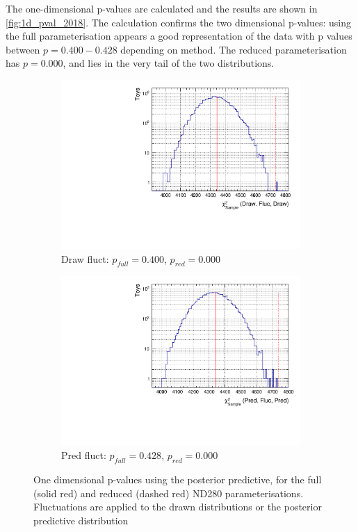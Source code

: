 The one-dimensional p-values are calculated and the results are shown in \autoref{fig:1d_pval_2018}. The calculation confirms the two dimensional p-values: using the full parameterisation appears a good representation of the data with p values between $p=0.400-0.428$ depending on method. The reduced parameterisation has $p=0.000$, and lies in the very tail of the two distributions.
\begin{figure}[h]
	\centering
	\begin{subfigure}[t]{0.49\textwidth}
		\includegraphics[width=\textwidth, trim={0mm 0mm 0mm 0mm}, clip,page=1]{figures/mach3/2018/data/fullcov_pval_drawflucdraw}
		\caption{Draw fluct: $p_{full}=0.400$, $p_{red}=0.000$}
	\end{subfigure}
	\begin{subfigure}[t]{0.49\textwidth}
		\includegraphics[width=\textwidth, trim={0mm 0mm 0mm 0mm}, clip,page=1]{figures/mach3/2018/data/fullcov_pval_predflucpred}
		\caption{Pred fluct: $p_{full}=0.428$, $p_{red}=0.000$}
	\end{subfigure}
\caption{One dimensional p-values using the posterior predictive, for the full (solid red) and reduced (dashed red) ND280 parameterisations. Fluctuations are applied to the drawn distributions or the posterior predictive distribution}
\label{fig:1d_pval_2018}
\end{figure}

